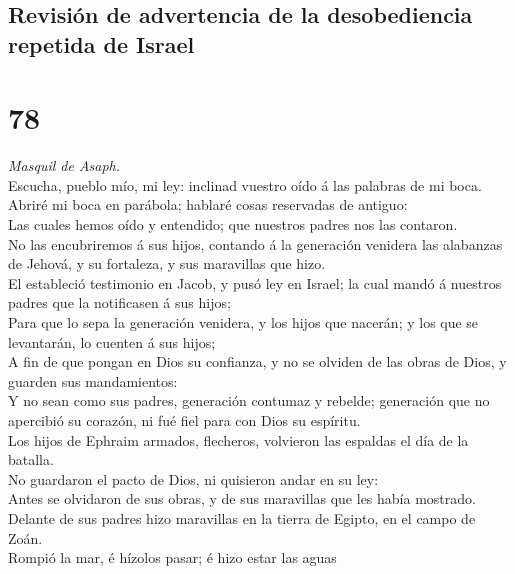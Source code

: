 \hypertarget{revisiuxf3n-de-advertencia-de-la-desobediencia-repetida-de-israel}{%
\subsection{Revisión de advertencia de la desobediencia repetida de
Israel}\label{revisiuxf3n-de-advertencia-de-la-desobediencia-repetida-de-israel}}

\hypertarget{section-77}{%
\section{78}\label{section-77}}

 \emph{Masquil de Asaph.}\\
Escucha, pueblo mío, mi ley: inclinad vuestro oído á las palabras de mi
boca.\\
 Abriré mi boca en parábola; hablaré cosas reservadas de
antiguo:\\
 Las cuales hemos oído y entendido; que nuestros padres nos
las contaron.\\
 No las encubriremos á sus hijos, contando á la generación
venidera las alabanzas de Jehová, y su fortaleza, y sus maravillas que
hizo.\\
 El estableció testimonio en Jacob, y pusó ley en Israel; la
cual mandó á nuestros padres que la notificasen á sus hijos;\\
 Para que lo sepa la generación venidera, y los hijos que
nacerán; y los que se levantarán, lo cuenten á sus hijos;\\
 A fin de que pongan en Dios su confianza, y no se olviden
de las obras de Dios, y guarden sus mandamientos:\\
 Y no sean como sus padres, generación contumaz y rebelde;
generación que no apercibió su corazón, ni fué fiel para con Dios su
espíritu.\\
 Los hijos de Ephraim armados, flecheros, volvieron las
espaldas el día de la batalla.\\
 No guardaron el pacto de Dios, ni quisieron andar en su
ley:\\
 Antes se olvidaron de sus obras, y de sus maravillas que
les había mostrado.\\
 Delante de sus padres hizo maravillas en la tierra de
Egipto, en el campo de Zoán.\\
 Rompió la mar, é hízolos pasar; é hizo estar las aguas
